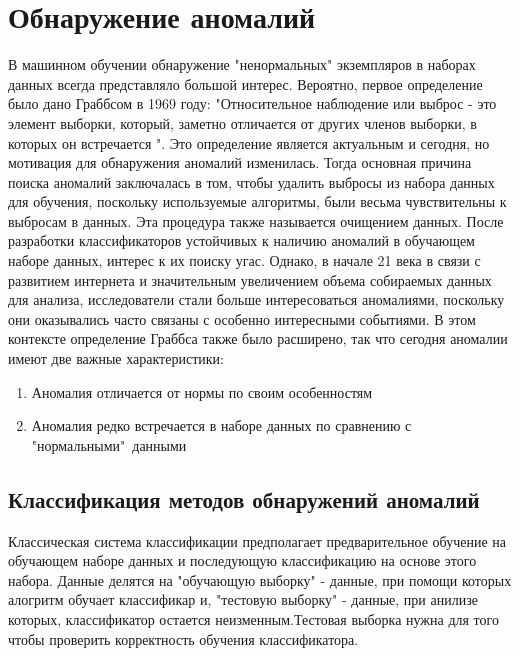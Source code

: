 \section{Обнаружение аномалий}
В машинном обучении обнаружение  "ненормальных" экземпляров в наборах данных всегда представляло большой интерес. Вероятно, первое определение было дано Граббсом\cite{Book02} в 1969 году: "Относительное наблюдение или выброс - это элемент выборки, который, заметно отличается от других членов выборки, в которых он встречается ".
Это определение является актуальным и сегодня, но мотивация для обнаружения аномалий изменилась. Тогда основная причина поиска аномалий заключалась в том, чтобы удалить выбросы из набора данных для обучения, поскольку   используемые алгоритмы, были весьма чувствительны к выбросам в данных. Эта процедура также называется очищением данных. После разработки классификаторов устойчивых к наличию аномалий в обучающем наборе данных, интерес к их поиску угас. Однако, в начале 21 века в связи с развитием интернета и значительным увеличением объема собираемых данных для анализа, исследователи стали больше интересоваться  аномалиями, поскольку они  оказывались часто связаны с особенно интересными событиями.  В этом контексте определение Граббса также было расширено, так что сегодня аномалии имеют две важные характеристики:
\begin{enumerate}
	\item Аномалия отличается от нормы по своим особенностям
	\item Аномалия редко встречается в наборе данных по сравнению с "нормальными"\  данными
\end{enumerate}
\subsection{Классификация методов обнаружений аномалий}
Классическая система классификации предполагает предварительное обучение на обучающем наборе данных и последующую классификацию на основе этого набора. Данные делятся на "обучающую выборку" - данные, при помощи которых алогритм обучает классификар и, "тестовую выборку" - данные, при анилизе которых, классификатор остается неизменным.Тестовая выборка нужна для того чтобы проверить корректность обучения классификатора.

